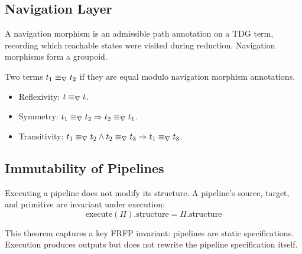 \subsection{Navigation Layer}

\begin{definition}
A navigation morphism is an admissible path annotation on a TDG term, recording
which reachable states were visited during reduction. Navigation morphisms form a
groupoid.
\end{definition}

\begin{definition}
Two terms $t_1 \equiv_\nabla t_2$ if they are equal modulo navigation morphism
annotations.
\end{definition}

\begin{theorem}
\begin{itemize}
  \item Reflexivity: $t \equiv_\nabla t$.
  \item Symmetry: $t_1 \equiv_\nabla t_2 \Rightarrow t_2 \equiv_\nabla t_1$.
  \item Transitivity: $t_1 \equiv_\nabla t_2 \wedge t_2 \equiv_\nabla t_3
                      \Rightarrow t_1 \equiv_\nabla t_3$.
\end{itemize}
\end{theorem}

\subsection{Immutability of Pipelines}

\begin{theorem}
Executing a pipeline does not modify its structure. A pipeline's source, target,
and primitive are invariant under execution:
\[
  \mathrm{execute}(\Pi).\mathrm{structure} = \Pi.\mathrm{structure}
\]
\end{theorem}

This theorem captures a key FRFP invariant: pipelines are static specifications.
Execution produces outputs but does not rewrite the pipeline specification itself.
